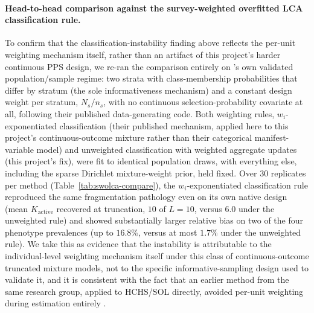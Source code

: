 \documentclass[11pt]{article}
\begin{document}
\paragraph{Head-to-head comparison against the survey-weighted overfitted LCA classification rule.} To confirm that the classification-instability finding above reflects the per-unit weighting mechanism itself, rather than an artifact of this project's harder continuous PPS design, we re-ran the comparison entirely on \citeauthor{wu2024swolca}'s own validated population/sample regime: two strata with class-membership probabilities that differ by stratum (the sole informativeness mechanism) and a constant design weight per stratum, $N_s/n_s$, with no continuous selection-probability covariate at all, following their published data-generating code. Both weighting rules, $w_i$-exponentiated classification (their published mechanism, applied here to this project's continuous-outcome mixture rather than their categorical manifest-variable model) and unweighted classification with weighted aggregate updates (this project's fix), were fit to identical population draws, with everything else, including the sparse Dirichlet mixture-weight prior, held fixed. Over 30 replicates per method (Table~\ref{tab:swolca-compare}), the $w_i$-exponentiated classification rule reproduced the same fragmentation pathology even on its own native design (mean $K_{\text{active}}$ recovered at truncation, $10$ of $L=10$, versus $6.0$ under the unweighted rule) and showed substantially larger relative bias on two of the four phenotype prevalences (up to $16.8\%$, versus at most $1.7\%$ under the unweighted rule). We take this as evidence that the instability is attributable to the individual-level weighting mechanism itself under this class of continuous-outcome truncated mixture models, not to the specific informative-sampling design used to validate it, and it is consistent with the fact that an earlier method from the same research group, applied to HCHS/SOL directly, avoided per-unit weighting during estimation entirely \citep{stephenson2020rpchchssol}.

\begin{table}[h]
\centering
\small
{}
\caption{Relative bias in estimated phenotype prevalence, $n=30$ replicates per method, on \citeauthor{wu2024swolca}'s own two-strata population/sample regime. Mean recovered active-component count: $10.0$ of $L=10$ ($w_i$-exponentiated) versus $6.0$ (unweighted).}
\label{tab:swolca-compare}
\end{table}
\end{document}
